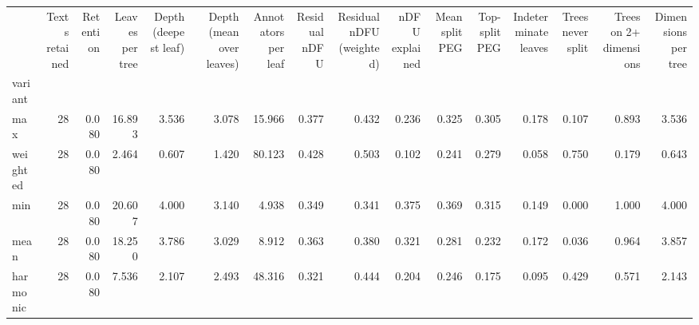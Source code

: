 \begin{tabular}{lrrrrrrrrrrrrrrr}
\toprule
 & Texts retained & Retention & Leaves per tree & Depth (deepest leaf) & Depth (mean over leaves) & Annotators per leaf & Residual nDFU & Residual nDFU (weighted) & nDFU explained & Mean split PEG & Top-split PEG & Indeterminate leaves & Trees never split & Trees on 2+ dimensions & Dimensions per tree \\
variant &  &  &  &  &  &  &  &  &  &  &  &  &  &  &  \\
\midrule
max & 28 & 0.080 & 16.893 & 3.536 & 3.078 & 15.966 & 0.377 & 0.432 & 0.236 & 0.325 & 0.305 & 0.178 & 0.107 & 0.893 & 3.536 \\
weighted & 28 & 0.080 & 2.464 & 0.607 & 1.420 & 80.123 & 0.428 & 0.503 & 0.102 & 0.241 & 0.279 & 0.058 & 0.750 & 0.179 & 0.643 \\
min & 28 & 0.080 & 20.607 & 4.000 & 3.140 & 4.938 & 0.349 & 0.341 & 0.375 & 0.369 & 0.315 & 0.149 & 0.000 & 1.000 & 4.000 \\
mean & 28 & 0.080 & 18.250 & 3.786 & 3.029 & 8.912 & 0.363 & 0.380 & 0.321 & 0.281 & 0.232 & 0.172 & 0.036 & 0.964 & 3.857 \\
harmonic & 28 & 0.080 & 7.536 & 2.107 & 2.493 & 48.316 & 0.321 & 0.444 & 0.204 & 0.246 & 0.175 & 0.095 & 0.429 & 0.571 & 2.143 \\
\bottomrule
\end{tabular}
